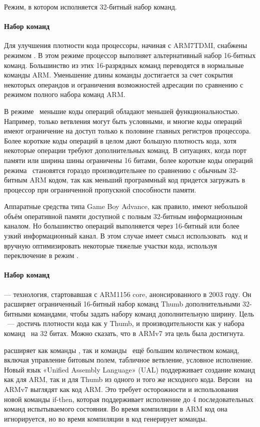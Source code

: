 Режим, в котором исполняется 32-битный набор команд.

\paragraph{Набор команд \thmod}

Для улучшения плотности кода процессоры, начиная с ARM7TDMI, снабжены режимом 
\thmod. В этом режиме процессор выполняет альтернативный набор 16-битных 
команд. Большинство из этих 16-разрядных команд переводятся в нормальные 
команды ARM. Уменьшение длины команды достигается за счет сокрытия некоторых 
операндов и ограничения возможностей адресации по сравнению с режимом полного 
набора команд ARM.

В режиме \thmod\ меньшие коды операций обладают меньшей функциональностью. 
Например, только ветвления могут быть условными, и многие коды операций имеют 
ограничение на доступ только к половине главных регистров процессора. Более 
короткие коды операций в целом дают большую плотность кода, хотя некоторые 
операции требуют дополнительных команд. В ситуациях, когда порт памяти или 
ширина шины ограничены 16 битами, более короткие коды операций режима 
\thmod\ становятся гораздо производительнее по сравнению с обычным 32-битным ARM 
кодом, так как меньший программный код придется загружать в процессор при 
ограниченной пропускной способности памяти.

Аппаратные средства типа Game Boy Advance, как правило, имеют небольшой объём 
оперативной памяти доступной с полным 32-битным информационным каналом. Но 
большинство операций выполняется через 16-битный или более узкий информационный 
канал. В этом случае имеет смысл использовать \thmod\ код и вручную 
оптимизировать некоторые тяжелые участки кода, используя переключение в 
режим \armod.

\paragraph{Набор команд }

 — технология, стартовавшая с ARM1156 core, анонсированного в 2003 
году. Он расширяет ограниченный 16-битный набор команд Thumb дополнительными 
32-битными командами, чтобы задать набору команд дополнительную ширину. Цель 
\ --- достичь плотности кода как у Thumb, и производительности как у 
набора команд \armod\ на 32 битах. Можно сказать, что в ARMv7 эта цель была 
достигнута.

 расширяет как команды \armod, так и команды \thmod\ ещё большим 
количеством команд, включая управление битовым полем, табличное ветвление, 
условное исполнение. Новый язык «Unified Assembly Language» (UAL) поддерживает 
создание команд как для ARM, так и для Thumb из одного и того же исходного 
кода. Версии \thmod\ на ARMv7 выглядят как код ARM. Это требует осторожности и 
использования новой команды if-then, которая поддерживает исполнение до 4 
последовательных команд испытываемого состояния. Во время компиляции в ARM 
код она игнорируется, но во время компиляции в код  генерирует команды.

